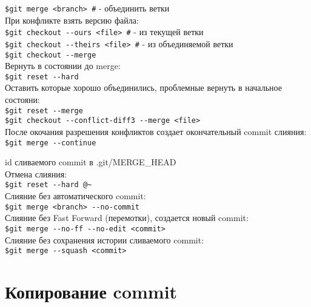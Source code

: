 \documentclass[12pt, a4paper]{article}
\begin{document}
\noindent \texttt{\$git merge <branch> \indent\#} - объединить ветки \\

\noindent При конфликте взять версию файла: \\
\indent \texttt{\$git checkout {-}-ours <file> \indent\#} - из текущей ветки  \\
\indent \texttt{\$git checkout {-}-theirs <file> \indent\#} - из объединяемой ветки \\

\noindent \texttt{\$git checkout {-}-merge} \\

\noindent Вернуть в состоянии до merge: \\
\indent \texttt{\$git reset {-}-hard} \\
\noindent Оставить которые хорошо объединились, проблемные вернуть в начальное состояни: \\
\indent \texttt{\$git reset {-}-merge} \\

\noindent \texttt{\$git checkout {-}-conflict-diff3 {-}-merge <file>} \\

\noindent После окочания разрешения конфликтов создает окончательный commit слияния: \\
\indent \texttt{\$git merge {-}-continue}

\noindent id сливаемого commit в .git/MERGE\_HEAD \\

\noindent Отмена слияния: \\
\indent \texttt{\$git reset {-}-hard {@}\~} \\

\noindent Слияние без автоматического commit: \\
\indent \texttt{\$git merge <branch> {-}-no-commit} \\

\noindent Слияние без Fast Forward (перемотки), создается новый commit: \\
\indent \texttt{\$git merge {-}-no-ff {-}-no-edit <commit>} \\

\noindent Слияние без сохранения истории сливаемого commit: \\
\indent \texttt{\$git merge {-}-squash <commit>} \\





\section{Копирование commit}
\end{document}
